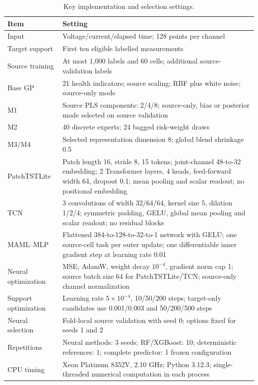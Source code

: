 \begin{table}[!htbp]\centering
\caption{Key implementation and selection settings.}\label{tab:implementation}
\papertablesize\setlength{\tabcolsep}{4pt}\renewcommand{\arraystretch}{1.15}
\begin{tabular}{p{}p{}}\toprule
Item & Setting\\\midrule
Input & Voltage/current/elapsed time; 128 points per channel\\
Target support & First ten eligible labelled measurements\\
Source training & At most 1,000 labels and 60 cells; additional source-validation labels\\
Base GP & 21 health indicators; source scaling; RBF plus white noise; source-only mode\\
M1 & Source PLS components: 2/4/8; source-only, bias or posterior mode selected on source validation\\
M2 & 40 discrete experts; 24 bagged risk-weight draws\\
M3/M4 & Selected representation dimension 8; global blend shrinkage 0.5\\
PatchTSTLite & Patch length 16, stride 8, 15 tokens; joint-channel 48-to-32 embedding; 2 Transformer layers, 4 heads, feed-forward width 64, dropout 0.1; mean pooling and scalar readout; no positional embedding\\
TCN & 3 convolutions of width 32/64/64, kernel size 5, dilation 1/2/4; symmetric padding, GELU, global mean pooling and scalar readout; no residual blocks\\
MAML--MLP & Flattened 384-to-128-to-32-to-1 network with GELU; one source-cell task per outer update; one differentiable inner gradient step at learning rate 0.01\\
Neural optimization & MSE; AdamW, weight decay $10^{-4}$, gradient norm cap 1; source batch size 64 for PatchTSTLite/TCN; source-only channel normalization\\
Support optimization & Learning rate $5\times10^{-4}$, 10/50/200 steps; target-only candidates use 0.001/0.003 and 50/200/500 steps\\
Neural selection & Fold-local source validation with seed 0; options fixed for seeds 1 and 2\\
Repetitions & Neural methods: 3 seeds; RF/XGBoost: 10; deterministic references: 1; complete predictor: 1 frozen configuration\\
CPU timing & Xeon Platinum 8352V, 2.10 GHz; Python 3.12.3; single-threaded numerical computation in each process\\\bottomrule
\end{tabular}
\end{table}
